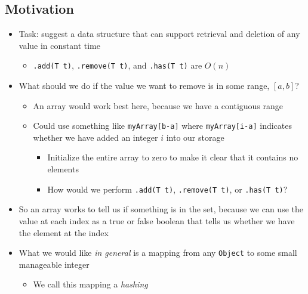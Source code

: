 \documentclass[10pt]{article}
\begin{document}
\subsection*{Motivation}
\begin{itemize}
    \item Task: suggest a data structure that can support retrieval and deletion of any value in constant time
    \begin{itemize}
        \item \texttt{.add(T t)}, \texttt{.remove(T t)}, and \texttt{.has(T t)} are $O(n)$
    \end{itemize}
    \item What should we do if the value we want to remove is in some range, $[a,b]$?
    \begin{itemize}
        \item An array would work best here, because we have a contiguous range
        \item Could use something like \texttt{myArray[b-a]} where \texttt{myArray[i-a]} indicates whether we have added an integer $i$ into our storage
        \begin{itemize}
            \item Initialize the entire array to zero to make it clear that it contains no elements
            \item How would we perform \texttt{.add(T t)}, \texttt{.remove(T t)}, or \texttt{.has(T t)}?
        \end{itemize}
    \end{itemize}
    \item So an array works to tell us if something is in the set, because we can use the value at each index as a true or false boolean that tells us whether we have the element at the index
    \item What we would like \textit{in general} is a mapping from any \texttt{Object} to some small manageable integer
    \begin{itemize}
        \item We call this mapping a \textit{hashing}
    \end{itemize}
\end{itemize}
\end{document}
